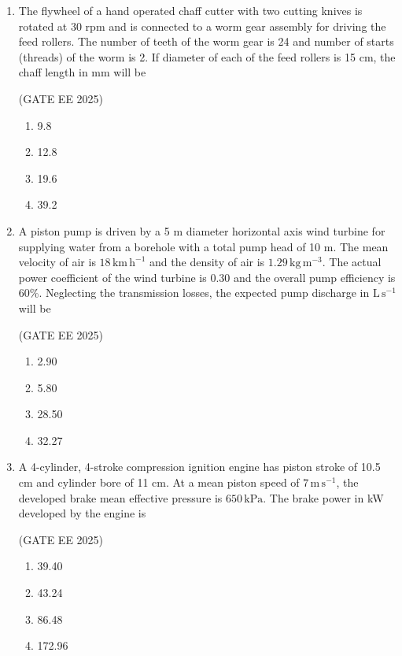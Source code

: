 \documentclass[journal,12pt,onecolumn]{IEEEtran}
\theoremstyle{remark}
\begin{document}
\begin{enumerate}
\item The flywheel of a hand operated chaff cutter with two cutting knives is rotated at 30 rpm and is connected to a worm gear assembly for driving the feed rollers. The number of teeth of the worm gear is 24 and number of starts (threads) of the worm is 2. If diameter of each of the feed rollers is 15 cm, the chaff length in mm will be\

\hfill(GATE EE 2025)

\begin{multicols}{4}
\begin{enumerate}
    \item 9.8
    \item 12.8
    \item 19.6
    \item 39.2
\end{enumerate}
\end{multicols}

\item A piston pump is driven by a 5 m diameter horizontal axis wind turbine for supplying water from a borehole with a total pump head of 10 m. The mean velocity of air is $18\,\mathrm{km\,h^{-1}}$ and the density of air is $1.29\,\mathrm{kg\,m^{-3}}$. The actual power coefficient of the wind turbine is 0.30 and the overall pump efficiency is 60\%. Neglecting the transmission losses, the expected pump discharge in $\mathrm{L\,s^{-1}}$ will be\

\hfill(GATE EE 2025)

\begin{multicols}{4}
\begin{enumerate}
    \item 2.90
    \item 5.80 
    \item 28.50
    \item 32.27
\end{enumerate}
\end{multicols}

\item A 4-cylinder, 4-stroke compression ignition engine has piston stroke of 10.5 cm and cylinder bore of 11 cm. At a mean piston speed of $7\,\mathrm{m\,s^{-1}}$, the developed brake mean effective pressure is $650\,\mathrm{kPa}$. The brake power in kW developed by the engine is\

\hfill(GATE EE 2025)

\begin{multicols}{4}
\begin{enumerate}
    \item 39.40
    \item 43.24
    \item 86.48
    \item 172.96
\end{enumerate}
\end{multicols}


\end{enumerate}
\end{document}
